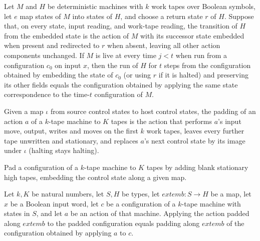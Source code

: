 \begin{lemma}
\label{Complexity.enumCont_return_run}
\leanok
{}
Let $M$ and $H$ be deterministic machines with $k$ work tapes over Boolean symbols, let
$e$ map states of $M$ into states of $H$, and choose a return state $r$ of $H$. Suppose
that, on every state, input reading, and work-tape reading, the transition of $H$ from
the embedded state is the action of $M$ with its successor state embedded when present
and redirected to $r$ when absent, leaving all other action components unchanged. If $M$
is live at every time $j<t$ when run from a configuration $c_0$ on input $x$, then the
run of $H$ for $t$ steps from the configuration obtained by embedding the state of $c_0$
(or using $r$ if it is halted) and preserving its other fields equals the configuration
obtained by applying the same state correspondence to the time-$t$ configuration of $M$.
\end{lemma}

\begin{definition}
\label{Complexity.enumCont_padAction}
\leanok
{}
Given a map $\iota$ from source control states to host control states, the padding
of an action $a$ of a $k$-tape machine to $K$ tapes is the action that performs
$a$'s input move, output, writes and moves on the first $k$ work tapes, leaves
every further tape unwritten and stationary, and replaces $a$'s next control state
by its image under $\iota$ (halting stays halting).
\end{definition}

\begin{definition}
\label{Complexity.enumCont_padCfg}
\leanok
{}
Pad a configuration of a $k$-tape machine to $K$ tapes by adding blank stationary
high tapes, embedding the control state along a given map.
\end{definition}

\begin{lemma}
\label{Complexity.enumCont_pad_apply}
\leanok
{}
Let $k,K$ be natural numbers, let $S,H$ be types, let $	ext{emb}:S\to H$ be a map, let
$x$ be a Boolean input word, let $c$ be a configuration of a $k$-tape machine with
states in $S$, and let $a$ be an action of that machine. Applying the action padded
along $	ext{emb}$ to the padded configuration equals padding along $	ext{emb}$ of the
configuration obtained by applying $a$ to $c$.
\end{lemma}

